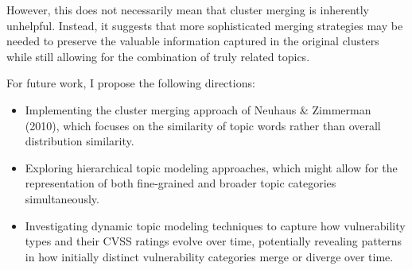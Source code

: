 However, this does not necessarily mean that cluster merging is inherently unhelpful. Instead, it suggests that more sophisticated merging strategies may be needed to preserve the valuable information captured in the original clusters while still allowing for the combination of truly related topics.

For future work, I propose the following directions:

\begin{itemize}
	\item Implementing the cluster merging approach of Neuhaus \& Zimmerman (2010), which focuses on the similarity of topic words rather than overall distribution similarity.
	\item Exploring hierarchical topic modeling approaches, which might allow for the representation of both fine-grained and broader topic categories simultaneously.
	\item Investigating dynamic topic modeling techniques to capture how vulnerability types and their CVSS ratings evolve over time, potentially revealing patterns in how initially distinct vulnerability categories merge or diverge over time.
\end{itemize}

